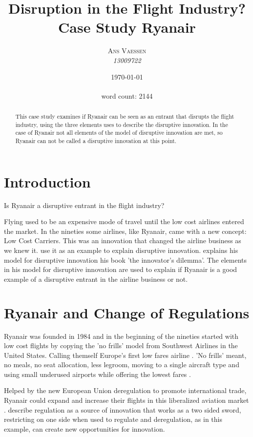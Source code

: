 \documentclass[a4paper, 11pt]{article}
\title{\textbf{Disruption in the Flight Industry?}\\Case Study Ryanair}
\author{\textsc{Ans Vaessen}
\\{\textit{13009722}}}
\date{\today\\ \ \\
word count: 2144}
\begin{document}
\maketitle

\begin{abstract}
This case study examines if Ryanair can be seen as an entrant that disrupts the flight industry, using the three elements \cite{Christensen97} uses to describe the disruptive innovation. In the case of Ryanair not all elements of the model of disruptive innovation are met, so Ryanair can not be called a disruptive innovation at this point. 
\end{abstract}

\vspace{30pt} %

\section*{Introduction}
Is Ryanair a disruptive entrant in the flight industry?


Flying used to be an expensive mode of travel until the low cost airlines entered the market. In the nineties some airlines, like Ryanair, came with a new concept: Low Cost Carriers. This was an innovation that changed the airline business as we knew it. \cite{TiddBessant} use it as an example to explain disruptive innovation. \cite{Christensen97} explains his model for disruptive innovation his book 'the innovator's dilemma'. The elements in his model for disruptive innovation are used to explain if Ryanair is a good example of a disruptive entrant in the airline business or not.

\section{Ryanair and Change of Regulations}

Ryanair was founded in 1984 and in the beginning of the nineties started with low cost flights by copying the 'no frills' model from Southwest Airlines in the United States. Calling themself Europe’s first low fares airline \citep{Ryanair}. 'No frills' meant, no meals, no seat allocation, less legroom, moving to a single aircraft type and using small underused airports while offering the lowest fares \citep{Diaconu}.

Helped by the new European Union deregulation to promote international trade, Ryanair could expand and increase their flights in this liberalized aviation market \citep{Diaconu}. \cite{TiddBessant} describe regulation as a source of innovation that works as a two sided sword, restricting on one side when used to regulate and deregulation, as in this example, can create new opportunities for innovation.
\end{document}
